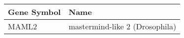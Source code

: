\begin{tabular}{ll}
\toprule
Gene Symbol &                           Name \\
\midrule
      MAML2 & mastermind-like 2 (Drosophila) \\
\bottomrule
\end{tabular}
